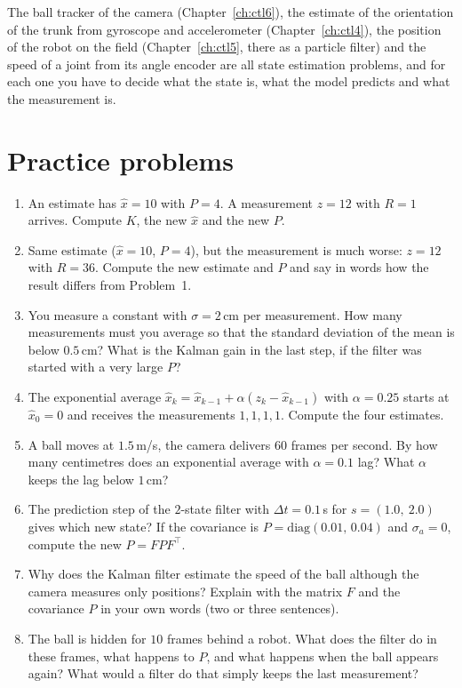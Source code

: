 \begin{aibox}
The ball tracker of the camera (Chapter~\ref{ch:ctl6}), the estimate of the orientation of the trunk from gyroscope and accelerometer (Chapter~\ref{ch:ctl4}), the position of the robot on the field (Chapter~\ref{ch:ctl5}, there as a particle filter) and the speed of a joint from its angle encoder are all state estimation problems, and for each one you have to decide what the state is, what the model predicts and what the measurement is.
\end{aibox}

\section*{Practice problems}
\begin{enumerate}[label=\textbf{\thechapter.\arabic*}]
  \item An estimate has $\hat x=10$ with $P=4$. A measurement $z=12$ with $R=1$ arrives. Compute $K$, the new $\hat x$ and the new $P$.
  \item Same estimate ($\hat x=10$, $P=4$), but the measurement is much worse: $z=12$ with $R=36$. Compute the new estimate and $P$ and say in words how the result differs from Problem~1.
  \item You measure a constant with $\sigma=2$\,cm per measurement. How many measurements must you average so that the standard deviation of the mean is below $0.5$\,cm? What is the Kalman gain in the last step, if the filter was started with a very large $P$?
  \item The exponential average $\hat x_k=\hat x_{k-1}+\alpha(z_k-\hat x_{k-1})$ with $\alpha=0.25$ starts at $\hat x_0=0$ and receives the measurements $1,1,1,1$. Compute the four estimates.
  \item A ball moves at $1.5$\,m/s, the camera delivers $60$ frames per second. By how many centimetres does an exponential average with $\alpha=0.1$ lag? What $\alpha$ keeps the lag below $1$\,cm?
  \item The prediction step of the $2$-state filter with $\Delta t=0.1$\,s for $s=(1.0,\ 2.0)$ gives which new state? If the covariance is $P=\mathrm{diag}(0.01,\,0.04)$ and $\sigma_a=0$, compute the new $P=FPF^{\top}$.
  \item Why does the Kalman filter estimate the speed of the ball although the camera measures only positions? Explain with the matrix $F$ and the covariance $P$ in your own words (two or three sentences).
  \item The ball is hidden for $10$ frames behind a robot. What does the filter do in these frames, what happens to $P$, and what happens when the ball appears again? What would a filter do that simply keeps the last measurement?

\end{enumerate}
